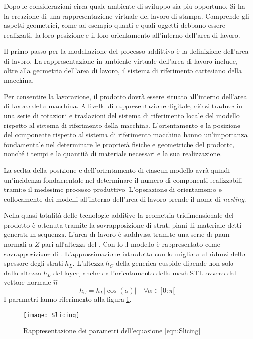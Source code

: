 Dopo le considerazioni circa quale ambiente di sviluppo sia più opportuno.
Si ha la creazione  di una rappresentazione virtuale del lavoro di stampa.
Comprende gli aspetti geometrici, come ad esempio quanti e quali oggetti debbano essere realizzati, la loro posizione e il loro orientamento all'interno dell'area di lavoro.

Il primo passo per la modellazione del processo addittivo è la definizione dell'area di lavoro.
La rappresentazione in ambiente virtuale dell'area di lavoro include, oltre alla geometria dell'area di lavoro, il sistema di riferimento cartesiano della macchina.

Per consentire la lavorazione, il prodotto dovrà essere situato all'interno dell'area di lavoro della macchina.
A livello di rappresentazione digitale, ciò si traduce in una serie di rotazioni e traslazioni del sistema di riferimento locale del modello rispetto al sistema di riferimento della macchina.
L'orientamento e la posizione del componente rispetto al sistema di riferimento macchina hanno un'importanza fondamentale nel determinare le proprietà fisiche e geometriche del prodotto, nonché i tempi e la quantità di materiale necessari e la sua realizzazione.

La scelta della posizione e dell'orientamento di ciascun modello avrà quindi un'incidenza fondamentale nel determinare il numero di componenti realizzabili tramite il medesimo processo produttivo. L'operazione di orientamento e collocamento dei modelli all'interno dell'area di lavoro prende il nome di \emph{nesting}.

Nella quasi totalità delle tecnologie additive la geometria tridimensionale del prodotto è ottenuta tramite la sovrapposizione di strati piani di materiale detti  generati in sequenza.
L'area di lavoro è suddivisa tramite una serie di piani normali a $Z$ pari all'altezza del .
Con lo  il modello è rappresentato come sovrapposizione di .
L'approssimazione introdotta con lo  migliora al ridursi dello spessore degli strati $h_L$.
L'altezza $h_C$ della generica cuspide dipende non solo dalla altezza $h_L$ del layer, anche dall'orientamento della mesh \ac{STL} ovvero dal vettore normale $\widehat{n}$ 
\begin{equation}
h_C = h_L |\cos(\alpha)| \quad \forall \alpha \in ]0:\pi[ \label{eqn:Slicing}
\end{equation}
I parametri fanno riferimento alla figura \ref{fig:Slicing}.
\begin{figure}
\centering
\texttt{[image: Slicing]}
\caption{Rappresentazione dei parametri dell'equazione \eqref{eqn:Slicing}}
\label{fig:Slicing}
\end{figure}

